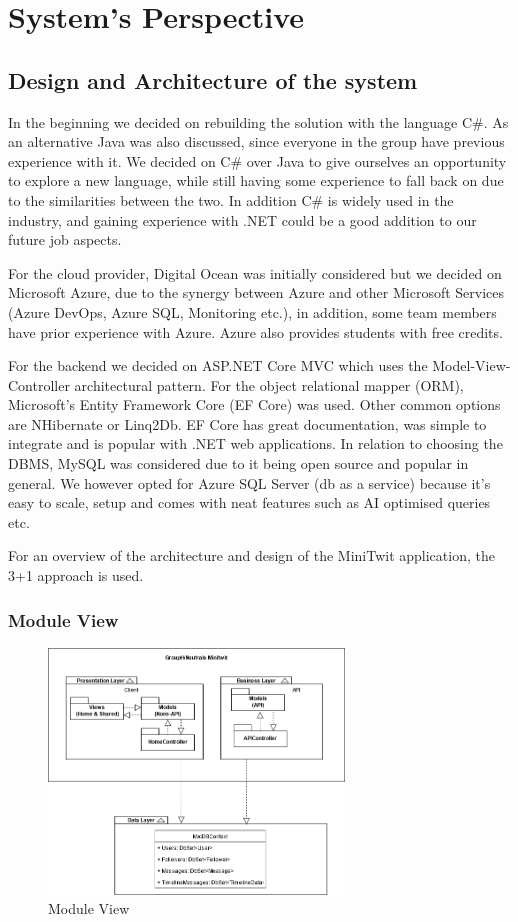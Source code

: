 \documentclass{article}
\begin{document}
\section{System's Perspective}
\subsection{Design and Architecture of the system}
In the beginning we decided on rebuilding the solution with the language C\#. As an alternative Java was also discussed, since everyone in the group have previous experience with it. We decided on C\# over Java to give ourselves an opportunity to explore a new language, while still having some experience to fall back on due to the similarities between the two. In addition C\# is widely used in the industry, and gaining experience with .NET could be a good addition to our future job aspects.

For the cloud provider, Digital Ocean was initially considered but we decided on Microsoft Azure, due to the synergy between Azure and other Microsoft Services (Azure DevOps, Azure SQL, Monitoring etc.), in addition, some team members have prior experience with Azure. Azure also provides students with free credits.

For the backend we decided on ASP.NET Core MVC which uses the Model-View-Controller architectural pattern. For the object relational mapper (ORM), Microsoft’s Entity Framework Core (EF Core) was used. Other common options are NHibernate or Linq2Db. EF Core has great documentation, was simple to integrate and is popular with .NET web applications. In relation to choosing the DBMS, MySQL was considered due to it being open source and popular in general. We however opted for Azure SQL Server (db as a service) because it's easy to scale, setup and comes with neat features such as AI optimised queries etc.

For an overview of the architecture and design of the MiniTwit application, the 3+1 approach is used. 

\subsubsection*{Module View}
\begin{figure}[H]
\centering
\includegraphics[width=0.7\textwidth]{images/Module View (3+1).png}
\caption{\label{fig:modview} Module View}
\end{figure}
\end{document}
